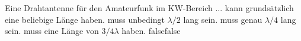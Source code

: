     {Eine Drahtantenne für den Amateurfunk im KW-Bereich ...}
    {kann grundsätzlich eine beliebige Länge haben.}
    {muss unbedingt $\lambda/2$ lang sein.}
    {muss genau $\lambda/4$ lang sein.}
    {muss eine Länge von $3/4 \lambda$  haben.}
    {false}{false}